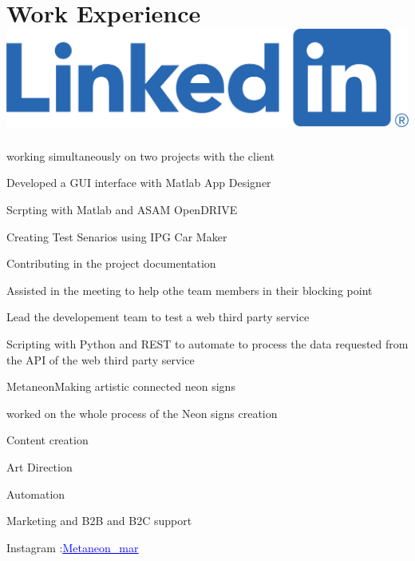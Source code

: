 \documentclass{my_cv}
\begin{document}
\section{Work Experience \hfill  {\small \href{https://www.linkedin.com/in/hamid-tasra-943700126/}{\includegraphics[scale=0.075]{LI-Logo.png}}}}
{}{working simultaneously on two projects with the client}{
    \item  Developed a GUI interface with Matlab App Designer 
    \item  Scrpting with Matlab and ASAM OpenDRIVE 
    \item Creating Test Senarios using IPG Car Maker
    \item Contributing in the project documentation
     \item Assisted in the meeting to help othe team members in their blocking point
      \item Lead the developement team to test a web third party service
      \item Scripting with Python and REST to automate to process the data requested from the API of the web third party service

}\vspace{0.1cm}
{Metaneon}{Making artistic connected neon signs }{
    \item worked on the whole process of the Neon signs creation
    \item Content creation 
    \item Art Direction 
    \item Automation 
   \item Marketing and B2B and B2C support
   \item Instagram :\href{https://www.instagram.com/metaneon_mar/}{\textcolor{blue}{\underline{Metaneon\_mar}}}


}\vspace{0.1cm}
\end{document}
